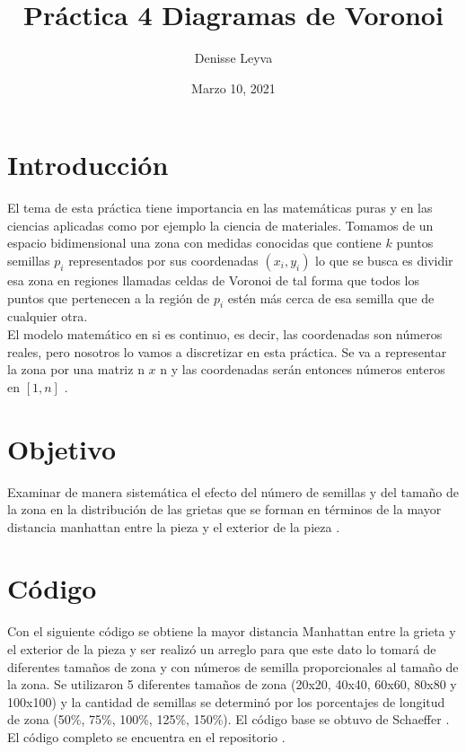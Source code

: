 \documentclass{article}
\title{Práctica 4 Diagramas de Voronoi}
\author{Denisse Leyva}
\date{Marzo 10, 2021}
\begin{document}
\maketitle




\section{Introducción}
El tema de esta práctica tiene importancia en las matemáticas puras y en las ciencias aplicadas como por ejemplo la ciencia de materiales. Tomamos de un espacio bidimensional una zona con medidas conocidas que contiene $k$ puntos semillas $p_{i}$ representados por sus coordenadas $(x_{i},y_{i})$ lo que se busca es dividir esa zona en regiones llamadas celdas de Voronoi de tal forma que todos los puntos que pertenecen a la región de $p_{i}$ estén más cerca de esa semilla que de cualquier otra. \\
El modelo matemático en si es continuo, es decir, las coordenadas son números reales, pero nosotros lo vamos a discretizar en esta práctica. Se va a representar la zona por una matriz n $x$ n y las coordenadas serán entonces números enteros en $[1, n]$ \cite{Satu_Elisa_Schaeffer}.

\section{Objetivo}
Examinar de manera sistemática el efecto del número de semillas y del tamaño de la zona en la distribución de las grietas que se forman en términos de la mayor distancia manhattan entre la pieza y el exterior de la pieza \cite{Satu_Elisa_Schaeffer}.

\section{Código}
Con el siguiente código se obtiene la mayor distancia Manhattan entre la grieta y el exterior de la pieza y ser realizó un arreglo para que este dato lo tomará de diferentes tamaños de zona y con números de semilla proporcionales al tamaño de la zona. 
Se utilizaron 5 diferentes tamaños de zona (20x20, 40x40, 60x60, 80x80 y 100x100) y la cantidad de semillas se determinó por los porcentajes de longitud de zona (50\%, 75\%, 100\%, 125\%, 150\%).
El código base se obtuvo de Schaeffer \cite{Elisa_Schaeffer}. El código completo se encuentra en el repositorio \cite{Denisse_Leyva}.
\end{document}
